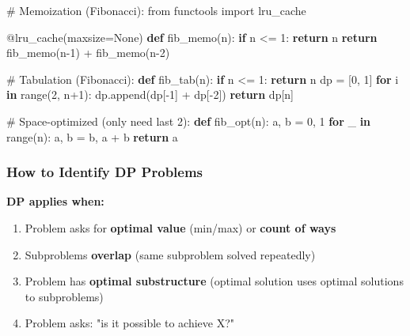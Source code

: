 \documentclass[11pt]{article}
\providecommand{\tightlist}{\setlength{\itemsep}{1pt}\setlength{\parskip}{0pt}}
\newenvironment{Shaded}{\begin{snugshade}}{\end{snugshade}}
\newcommand{\AttributeTok}[1]{\textcolor[rgb]{0.16,0.50,0.73}{#1}}
\newcommand{\BuiltInTok}[1]{\textcolor[rgb]{0.50,0.55,0.55}{#1}}
\newcommand{\CommentTok}[1]{\textcolor[rgb]{0.48,0.49,0.49}{#1}}
\newcommand{\ControlFlowTok}[1]{\textcolor[rgb]{0.99,0.74,0.29}{\textbf{#1}}}
\newcommand{\DecValTok}[1]{\textcolor[rgb]{0.96,0.45,0.00}{#1}}
\newcommand{\ImportTok}[1]{\textcolor[rgb]{0.15,0.68,0.38}{#1}}
\newcommand{\KeywordTok}[1]{\textcolor[rgb]{0.81,0.81,0.76}{\textbf{#1}}}
\newcommand{\NormalTok}[1]{\textcolor[rgb]{0.81,0.81,0.76}{#1}}
\newcommand{\OperatorTok}[1]{\textcolor[rgb]{0.81,0.81,0.76}{#1}}
\newcommand{\VariableTok}[1]{\textcolor[rgb]{0.15,0.68,0.68}{#1}}
\begin{document}
\begin{Shaded}
\begin{Highlighting}[]
\CommentTok{\# Memoization (Fibonacci):}
\ImportTok{from}\NormalTok{ functools }\ImportTok{import}\NormalTok{ lru\_cache}

\AttributeTok{@lru\_cache}\NormalTok{(maxsize}\OperatorTok{=}\VariableTok{None}\NormalTok{)}
\KeywordTok{def}\NormalTok{ fib\_memo(n):}
    \ControlFlowTok{if}\NormalTok{ n }\OperatorTok{\textless{}=} \DecValTok{1}\NormalTok{: }\ControlFlowTok{return}\NormalTok{ n}
    \ControlFlowTok{return}\NormalTok{ fib\_memo(n}\OperatorTok{{-}}\DecValTok{1}\NormalTok{) }\OperatorTok{+}\NormalTok{ fib\_memo(n}\OperatorTok{{-}}\DecValTok{2}\NormalTok{)}

\CommentTok{\# Tabulation (Fibonacci):}
\KeywordTok{def}\NormalTok{ fib\_tab(n):}
    \ControlFlowTok{if}\NormalTok{ n }\OperatorTok{\textless{}=} \DecValTok{1}\NormalTok{: }\ControlFlowTok{return}\NormalTok{ n}
\NormalTok{    dp }\OperatorTok{=}\NormalTok{ [}\DecValTok{0}\NormalTok{, }\DecValTok{1}\NormalTok{]}
    \ControlFlowTok{for}\NormalTok{ i }\KeywordTok{in} \BuiltInTok{range}\NormalTok{(}\DecValTok{2}\NormalTok{, n}\OperatorTok{+}\DecValTok{1}\NormalTok{):}
\NormalTok{        dp.append(dp[}\OperatorTok{{-}}\DecValTok{1}\NormalTok{] }\OperatorTok{+}\NormalTok{ dp[}\OperatorTok{{-}}\DecValTok{2}\NormalTok{])}
    \ControlFlowTok{return}\NormalTok{ dp[n]}

\CommentTok{\# Space{-}optimized (only need last 2):}
\KeywordTok{def}\NormalTok{ fib\_opt(n):}
\NormalTok{    a, b }\OperatorTok{=} \DecValTok{0}\NormalTok{, }\DecValTok{1}
    \ControlFlowTok{for}\NormalTok{ \_ }\KeywordTok{in} \BuiltInTok{range}\NormalTok{(n):}
\NormalTok{        a, b }\OperatorTok{=}\NormalTok{ b, a }\OperatorTok{+}\NormalTok{ b}
    \ControlFlowTok{return}\NormalTok{ a}
\end{Highlighting}
\end{Shaded}

\subsubsection{How to Identify DP Problems}\label{how-to-identify-dp-problems}

\textbf{DP applies when:}

\begin{enumerate}
\def\labelenumi{\arabic{enumi}.}
\tightlist
\item
  Problem asks for \textbf{optimal value} (min/max) or \textbf{count of ways}
\item
  Subproblems \textbf{overlap} (same subproblem solved repeatedly)
\item
  Problem has \textbf{optimal substructure} (optimal solution uses optimal solutions to subproblems)
\item
  Problem asks: "is it possible to achieve X?"
\end{enumerate}
\end{document}
